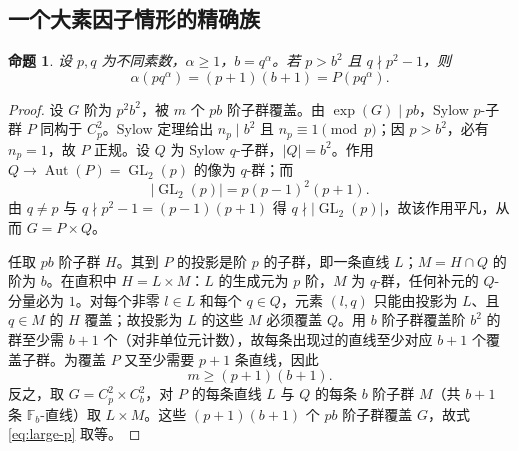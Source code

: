 \documentclass[11pt,a4paper]{article}
\numberwithin{equation}{section}
\theoremstyle{plain}
\newtheorem{proposition}[theorem]{命题}
\theoremstyle{definition}
\theoremstyle{remark}
\newcommand{\F}{\mathbb{F}}
\begin{document}
\subsection{一个大素因子情形的精确族}\label{sec:large-p}
\begin{proposition}\label{prop:large-p}
设 $p,q$ 为不同素数，$\alpha\ge1$，$b=q^\alpha$。若 $p>b^2$ 且 $q\nmid p^2-1$，则
\begin{equation}\label{eq:large-p}
 \boxed{\alpha(pq^\alpha)=(p+1)(b+1)=P(pq^\alpha).}
\end{equation}
\end{proposition}
\begin{proof}
设 $G$ 阶为 $p^2b^2$，被 $m$ 个 $pb$ 阶子群覆盖。由 $\exp(G)\mid pb$，Sylow $p$-子群 $P$ 同构于 $C_p^2$。Sylow 定理给出 $n_p\mid b^2$ 且 $n_p\equiv1\pmod p$；因 $p>b^2$，必有 $n_p=1$，故 $P$ 正规。设 $Q$ 为 Sylow $q$-子群，$|Q|=b^2$。作用 $Q\to\operatorname{Aut}(P)=\operatorname{GL}_2(p)$ 的像为 $q$-群；而
\[
|\operatorname{GL}_2(p)|=p(p-1)^2(p+1).
\]
由 $q\ne p$ 与 $q\nmid p^2-1=(p-1)(p+1)$ 得 $q\nmid|\operatorname{GL}_2(p)|$，故该作用平凡，从而 $G=P\times Q$。

任取 $pb$ 阶子群 $H$。其到 $P$ 的投影是阶 $p$ 的子群，即一条直线 $L$；$M=H\cap Q$ 的阶为 $b$。在直积中 $H=L\times M$：$L$ 的生成元为 $p$ 阶，$M$ 为 $q$-群，任何补元的 $Q$-分量必为 $1$。对每个非零 $l\in L$ 和每个 $q\in Q$，元素 $(l,q)$ 只能由投影为 $L$、且 $q\in M$ 的 $H$ 覆盖；故投影为 $L$ 的这些 $M$ 必须覆盖 $Q$。用 $b$ 阶子群覆盖阶 $b^2$ 的群至少需 $b+1$ 个（对非单位元计数），故每条出现过的直线至少对应 $b+1$ 个覆盖子群。为覆盖 $P$ 又至少需要 $p+1$ 条直线，因此
\[
m\ge(p+1)(b+1).
\]
反之，取 $G=C_p^2\times C_b^2$，对 $P$ 的每条直线 $L$ 与 $Q$ 的每条 $b$ 阶子群 $M$（共 $b+1$ 条 $\F_b$-直线）取 $L\times M$。这些 $(p+1)(b+1)$ 个 $pb$ 阶子群覆盖 $G$，故式 \eqref{eq:large-p} 取等。
\end{proof}
\end{document}
